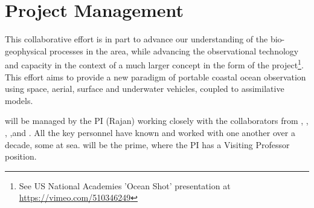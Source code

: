 \section{Project Management}

This collaborative effort is in part to advance our understanding of
the bio-geophysical processes in the \naz area, while advancing the
observational technology and capacity in the context of a much larger
concept in the form of the \met project\footnote{See US National
  Academies 'Ocean Shot' presentation at
  \url{https://vimeo.com/510346249}}. This effort aims to provide a
new paradigm of portable coastal ocean observation using space,
aerial, surface and underwater vehicles, coupled to assimilative
models.

\proj will be managed by the PI (Rajan) working closely with the
collaborators from \unive, \coloe, \mite, \soce,\avee and \inste. All
the key personnel have known and worked with one another over a
decade, some at sea. \univ will be the prime, where the PI has a
Visiting Professor position.

